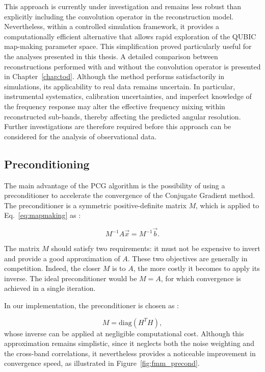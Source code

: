 \documentclass[../../thesis.tex]{subfiles}
\begin{document}
This approach is currently under investigation and remains less robust than explicitly including the convolution operator in the reconstruction model. Nevertheless, within a controlled simulation framework, it provides a computationally efficient alternative that allows rapid exploration of the QUBIC map-making parameter space. This simplification proved particularly useful for the analyses presented in this thesis. A detailed comparison between reconstructions performed with and without the convolution operator is presented in Chapter~\ref{chap:tod}.
Although the method performs satisfactorily in simulations, its applicability to real data remains uncertain. In particular, instrumental systematics, calibration uncertainties, and imperfect knowledge of the frequency response may alter the effective frequency mixing within reconstructed sub-bands, thereby affecting the predicted angular resolution. Further investigations are therefore required before this approach can be considered for the analysis of observational data.

\subsection{Preconditioning} \label{sub:fmm_precond}

The main advantage of the PCG algorithm is the possibility of using a preconditioner to accelerate the convergence of the Conjugate Gradient method. The preconditioner is a symmetric positive-definite matrix $M$, which is applied to Eq.~\ref{eq:mapmaking} as :

\begin{equation}
M^{-1} A \vec{x} = M^{-1} \vec{b}.
\end{equation}

The matrix $M$ should satisfy two requirements: it must not be expensive to invert and provide a good approximation of $A$. These two objectives are generally in competition. Indeed, the closer $M$ is to $A$, the more costly it becomes to apply its inverse. The ideal preconditioner would be $M=A$, for which convergence is achieved in a single iteration.

In our implementation, the preconditioner is chosen as :

\begin{equation}
    M = \mathrm{diag}(H^{T}H),
\end{equation}
whose inverse can be applied at negligible computational cost. Although this approximation remains simplistic, since it neglects both the noise weighting and the cross-band correlations, it nevertheless provides a noticeable improvement in convergence speed, as illustrated in Figure~\ref{fig:fmm_precond}.
\end{document}
